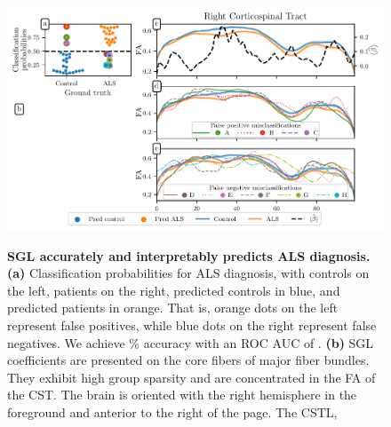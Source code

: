 \documentclass[10pt,%
               aps,%
               prl,%
               preprint,%
               superscriptaddress,%
               preprintnumbers,%
               amsmath,%
               floatfix,%
               endfloats*]{revtex4-1}
\begin{document}
\begin{figure}
    \vspace{3cm}
    \vspace{-8.4cm}
    \includegraphics[width=\textwidth]{als_results.pdf}
    {\label{fig:class-results:probs}}
    {\label{fig:class-results:coefs3d}}
    {\label{fig:class-results:tract-profiles}}
    {\label{fig:class-results:false-positives}}
    {\label{fig:class-results:false-negatives}}
    \caption{%
        {\bf SGL accurately and interpretably predicts ALS diagnosis.}
        \label{fig:class-results}
        {\bf (a)} Classification probabilities for ALS diagnosis, with
        controls on the left, patients on the right, predicted controls in
        blue, and predicted patients in orange. That is, orange dots on the left
        represent false positives, while blue dots on the right represent
        false negatives. We achieve {\protect\alsAccuracy}\% accuracy with an
        ROC AUC of {\protect\alsRocAuc}.
        {\bf (b)} SGL coefficients are presented on the core fibers of major
        fiber bundles. They exhibit high group sparsity and are concentrated
        in the FA of the CST. The brain is oriented with the right hemisphere
        in the foreground and anterior to the right of the page. The CSTL,
}
\end{figure}
\end{document}
